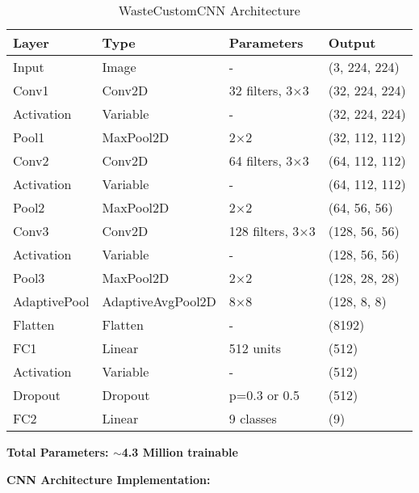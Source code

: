 \documentclass[12pt,a4paper]{article}
\begin{document}
\begin{table}[H]
\centering
\caption{WasteCustomCNN Architecture}
\begin{tabular}{llll}
\toprule
\textbf{Layer} & \textbf{Type} & \textbf{Parameters} & \textbf{Output} \\
\midrule
Input & Image & - & (3, 224, 224) \\
Conv1 & Conv2D & 32 filters, 3×3 & (32, 224, 224) \\
Activation & Variable & - & (32, 224, 224) \\
Pool1 & MaxPool2D & 2×2 & (32, 112, 112) \\
\midrule
Conv2 & Conv2D & 64 filters, 3×3 & (64, 112, 112) \\
Activation & Variable & - & (64, 112, 112) \\
Pool2 & MaxPool2D & 2×2 & (64, 56, 56) \\
\midrule
Conv3 & Conv2D & 128 filters, 3×3 & (128, 56, 56) \\
Activation & Variable & - & (128, 56, 56) \\
Pool3 & MaxPool2D & 2×2 & (128, 28, 28) \\
\midrule
AdaptivePool & AdaptiveAvgPool2D & 8×8 & (128, 8, 8) \\
Flatten & Flatten & - & (8192) \\
FC1 & Linear & 512 units & (512) \\
Activation & Variable & - & (512) \\
Dropout & Dropout & p=0.3 or 0.5 & (512) \\
FC2 & Linear & 9 classes & (9) \\
\bottomrule
\end{tabular}
\end{table}

\textbf{Total Parameters: $\sim$4.3 Million trainable}

\vspace{0.3cm}

\textbf{CNN Architecture Implementation:}
\end{document}
